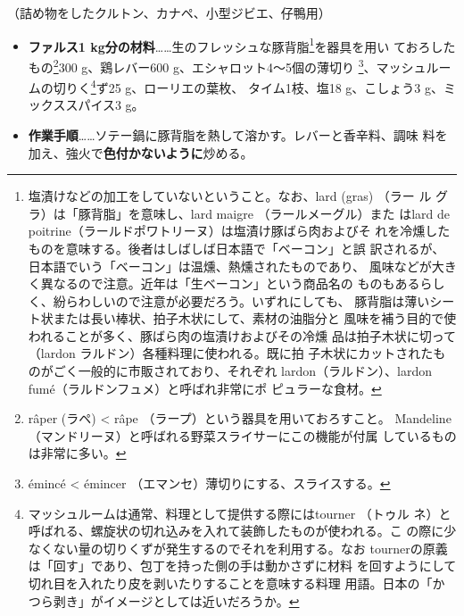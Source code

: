 \begin{recette}


（詰め物をしたクルトン、カナペ、小型ジビエ、仔鴨用）

\begin{itemize}
\item
  \textbf{ファルス1
  kg分の材料}\ldots{}\ldots{}生のフレッシュな豚背脂\footnote{塩漬けなどの加工をしていないということ。なお、lard
    (gras) （ラー ル グラ）は「豚背脂」を意味し、lard maigre
    （ラールメーグル）また はlard de
    poitrine（ラールドポワトリーヌ）は塩漬け豚ばら肉およびそ
    れを冷燻したものを意味する。後者はしばしば日本語で「ベーコン」と誤
    訳されるが、日本語でいう「ベーコン」は温燻、熱燻されたものであり、
    風味などが大きく異なるので注意。近年は「生ベーコン」という商品名の
    ものもあるらしく、紛らわしいので注意が必要だろう。いずれにしても、
    豚背脂は薄いシート状または長い棒状、拍子木状にして、素材の油脂分と
    風味を補う目的で使われることが多く、豚ばら肉の塩漬けおよびその冷燻
    品は拍子木状に切って（lardon ラルドン）各種料理に使われる。既に拍
    子木状にカットされたものがごく一般的に市販されており、それぞれ
    lardon（ラルドン）、lardon fumé（ラルドンフュメ）と呼ばれ非常にポ
    ピュラーな食材。}を器具を用い ておろしたもの\footnote{râper (ラペ)
    \textless{} râpe （ラープ）という器具を用いておろすこと。 Mandeline
    （マンドリーヌ）と呼ばれる野菜スライサーにこの機能が付属
    しているものは非常に多い。}300 g、鶏レバー600
  g、エシャロット4〜5個の薄切り \footnote{émincé \textless{} émincer
    （エマンセ）薄切りにする、スライスする。}、マッシュルームの切りく\footnote{マッシュルームは通常、料理として提供する際にはtourner
    （トゥル
    ネ）と呼ばれる、螺旋状の切れ込みを入れて装飾したものが使われる。こ
    の際に少なくない量の切りくずが発生するのでそれを利用する。なお
    tournerの原義は「回す」であり、包丁を持った側の手は動かさずに材料
    を回すようにして切れ目を入れたり皮を剥いたりすることを意味する料理
    用語。日本の「かつら剥き」がイメージとしては近いだろうか。}ず25
  g、ローリエの葉\undemi{}枚、 タイム1枝、塩18 g、こしょう3
  g、ミックススパイス3 g。
\item
  \textbf{作業手順}\ldots{}\ldots{}ソテー鍋に豚背脂を熱して溶かす。レバーと香辛料、調味
  料を加え、強火で\textbf{色付かないように}炒める。
\end{itemize}


\end{recette}
